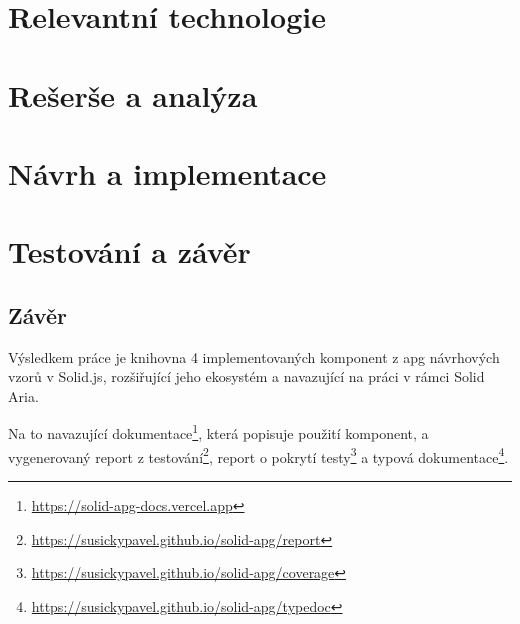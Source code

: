 \documentclass{ctuthesis}
\begin{document}

\maketitle



\part{Relevantní technologie}




\part{Rešerše a analýza}




\part{Návrh a implementace}




\part{Testování a závěr}



\chapter{Závěr}

Výsledkem práce je knihovna 4 implementovaných komponent z \gls{apg} návrhových vzorů v Solid.js, rozšiřující jeho ekosystém a navazující na práci v rámci Solid Aria.

Na to navazující dokumentace\footnote{\url{https://solid-apg-docs.vercel.app}}, která popisuje použití komponent, a vygenerovaný report z testování\footnote{\url{https://susickypavel.github.io/solid-apg/report}}, report o pokrytí testy\footnote{\url{https://susickypavel.github.io/solid-apg/coverage}} a typová dokumentace\footnote{\url{https://susickypavel.github.io/solid-apg/typedoc}}.
\end{document}
